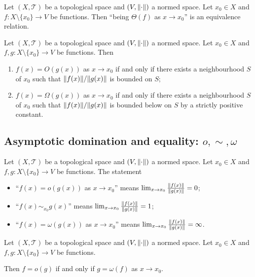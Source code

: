 \begin{lemma}
Let $(X,\mathcal{T})$ be a topological space and $(V,\lVert\cdot\rVert)$ a normed space. Let $x_0 \in X$ and $f: X\setminus\{x_0\}\to V$ be functions. Then ``being $\Theta(f)$ as $x\to x_0$'' is an equivalence relation.
\end{lemma}

\begin{lemma}
Let $(X,\mathcal{T})$ be a topological space and $(V,\lVert\cdot\rVert)$ a normed space. Let $x_0 \in X$ and $f,g: X\setminus\{x_0\}\to V$ be functions. Then
\begin{enumerate}
\item $f(x) = O(g(x))$ as $x\to x_0$ \textup{if and only if} there exists a neighbourhood $S$ of $x_0$ such that $\lVert f(x)\rVert/\lVert g(x)\rVert$ is bounded on $S$;
\item $f(x) = \Omega(g(x))$ as $x\to x_0$ \textup{if and only if} there exists a neighbourhood $S$ of $x_0$ such that $\lVert f(x)\rVert/\lVert g(x)\rVert$ is bounded below on $S$ by a strictly positive constant.
\end{enumerate}
\end{lemma}

\subsection{Asymptotic domination and equality: $o,\sim,\omega$}
\begin{definition}
Let $(X,\mathcal{T})$ be a topological space and $(V,\lVert\cdot\rVert)$ a normed space. Let $x_0 \in X$ and $f,g: X\setminus\{x_0\}\to V$ be functions. The statement
\begin{itemize}
\item ``$f(x) = o(g(x))$ as $x\to x_0$'' means $\lim_{x\to x_0} \frac{\lVert f(x)\rVert}{\lVert g(x)\rVert} = 0$;
\item ``$f(x) \sim_{x_0} g(x)$'' means $\lim_{x\to x_0} \frac{\lVert f(x)\rVert}{\lVert g(x)\rVert} = 1$;
\item ``$f(x) = \omega(g(x))$ as $x\to x_0$'' means $\lim_{x\to x_0} \frac{\lVert f(x)\rVert}{\lVert g(x)\rVert} = \infty$.
\end{itemize}
\end{definition}

\begin{lemma}
Let $(X,\mathcal{T})$ be a topological space and $(V,\lVert\cdot\rVert)$ a normed space. Let $x_0 \in X$ and $f,g: X\setminus\{x_0\}\to V$ be functions.

Then $f = o(g)$ \textup{if and only if} $g = \omega(f)$ as $x\to x_0$.
\end{lemma}

